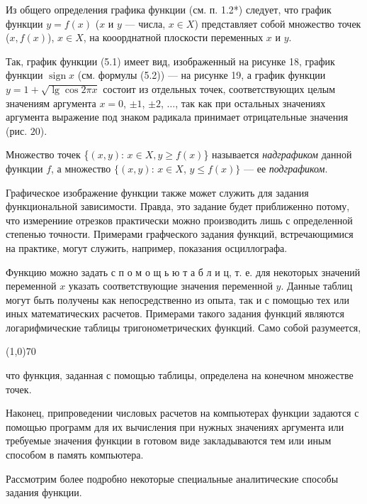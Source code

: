 \documentclass[12pt, legalpaper]{article}
\DeclareMathOperator{\sign}{sign}
\begin{document}
\large
Из общего определения графика функции (см. п. 1.2*) следует, что график функции $y = f(x)$ ($x$ и $y$ --- числа, $x \in X$) представляет собой множество точек 
($x, f(x)$), $x \in X$, на кооорднатной плоскости переменных $x$ и $y$.

Так, график функции (5.1) имеет вид, изображенный на рисунке 18, график функции $\sign x$ (см. формулы (5.2)) --- на рисунке 19, а график функции $y = 1 + \sqrt{\lg \cos 2\pi x}$ состоит из отдельных точек, соответствующих целым значениям аргумента $x = 0$, $\pm1$, $\pm2$, $\ldots$, так как при остальных значениях аргумента выражение под знаком радикала принимает отрицательные значения (рис. $20$).

Множество точек \{$(x, y)$: $x \in X, y \geqslant f(x)$\} называется \textit{надграфиком} данной функции $f$, а множество $\{(x, y)$: $x \in X$, $y \leqslant f(x)\}$ --- ее \textit{подграфиком}.

Графическое изображение функции также может служить для задания функциональной зависимости. Правда, это задание будет приближенно потому, что измерениие отрезков практически можно производить лишь с определенной степенью точности. Примерами графческого задания функций, встречающимися на практике, могут служить, например, показания осциллографа.

Функцию можно задать  с п о м о щ ь ю  т а б л и ц, т. е. для некоторых значений переменной $x$ указать соответствующие значения переменной $y$. Данные таблиц могут быть получены как непосредственно из опыта, так и с помощью тех или иных математических расчетов. Примерами такого задания функций являются логарифмические таблицы тригонометрических функций. Само собой разумеется, 
\newline
\newline
\newline
\newline
\begin{center}
   \line(1,0){70}
\end{center}

\newpage
что функция, заданная с помощью таблицы, определена на конечном множестве точек.


Наконец, припроведении числовых расчетов на компьютерах функции задаются с помощью программ для их вычисления при нужных значениях аргумента или требуемые значения функции в готовом виде закладываются тем или иным способом в память компьютера.

Рассмотрим более подробно некоторые специальные аналитические способы задания функции.
\end{document}
